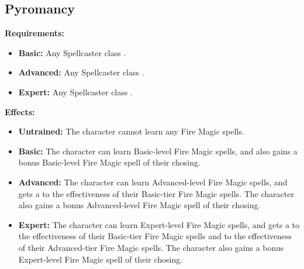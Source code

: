 \documentclass[openany,10pt,a4paper]{book}
\begin{document}
\subsection{Pyromancy}
\begin{table}[!ht]
\centering
{}
\end{table}
\textbf{Requirements:}
\begin{itemize}
	\item \textbf{Basic:} Any Spellcaster class .
	\item \textbf{Advanced:} Any Spellcaster class .
	\item \textbf{Expert:} Any Spellcaster class .
\end{itemize}
\textbf{Effects:}
\begin{itemize}
	\item \textbf{Untrained:} The character cannot learn any Fire Magic spells.
	\item \textbf{Basic:} The character can learn Basic-level Fire Magic spells, and also gains a bonus Basic-level Fire Magic spell of their chosing.
	\item \textbf{Advanced:} The character can learn Advanced-level Fire Magic spells, and gets a  to the effectiveness of their Basic-tier Fire Magic spells. The character also gains a bonus Advanced-level Fire Magic spell of their chosing.
	\item \textbf{Expert:} The character can learn Expert-level Fire Magic spells, and gets a  to the effectiveness of their Basic-tier Fire Magic spells and  to the effectiveness of their Advanced-tier Fire Magic spells. The character also gains a bonus Expert-level Fire Magic spell of their chosing.
\end{itemize}\newpage
\end{document}

